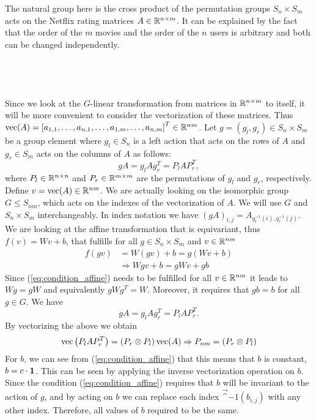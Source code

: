 \documentclass[english]{article}
\begin{document}
The natural group here is the cross product of the permutation groups
$S_n\times S_{m}$ acts on the Netflix rating matrices $A\in\RF^{n\times m}$.
It can be explained by the fact that the order of the $m$ movies
and the order of the $n$ users is arbitrary and both can be changed
independently.

\subsection{~}

\label{subsec:q21}


Since we look at the $G$-linear transformation from matrices in $\RF^{n\times m}$
to itself, it will be more convenient to consider the vectorization
of these matrices. Thus $\vec(A)=\left[a_{1,1},\ldots,a_{n,1},\ldots,a_{1,m},\ldots,a_{n,m}\right]^T\in\RF^{nm}$.
Let $g=\left(g_l,g_r\right)\in S_n\times S_{m}$ be a group
element where $g_l\in S_n$ is a left action that acts on the
rows of $A$ and $g_r\in S_{m}$ acts on the columns of $A$ as
follows: 
\begin{equation}
gA=g_lAg_r^T
=
P_lAP_r^T
,
\label{eq:groupAction}
\end{equation}
where $P_l\in\RF^{n\times n}$ and $P_r\in\RF^{m\times m}$ are
the permutations of $g_l$ and $g_r$, respectively. Define $v=\vec(A)\in\RF^{nm}$. 
We are actually looking on the isomorphic group $G \leq S_{nm}$, which acts on the indexes of the vectorization of $A$. We will use $G$ and $S_n \times S_m$ interchangeably.
In index notation we have $\left(gA\right)_{i,j}=A_{g_l^{-1}(i),g_r^{-1}(j)}$.
We are looking at the affine transformation that is equivariant, thus
$f(v)=Wv+b$, that fulfills for all $g\in S_n\times S_{m}$ and
$v\in\RF^{nm}$
\begin{align}
f(gv) 
&=
W\left(gv\right)+b=g\left(Wv+b\right)\nonumber \\
&
\Rightarrow Wgv+b=gWv+gb\label{eq:condition_affine}
\end{align}
Since (\ref{eq:condition_affine}) needs to be fulfilled for all $v\in\RF^{nm}$
it leads to $Wg=gW$ and equivalently $gWg^T=W$. Moreover, it requires
that $gb=b$ for all $g\in G$. 
We have 
\begin{equation}
gA=g_lAg_r^T=P_lAP_r^T.
\end{equation}
By vectorizing the above we obtain 
\begin{equation}
\vec\left(P_lAP_r^T\right)
=
\left(P_r\otimes P_l\right)\vec(A)
\Rightarrow
P_{nm} = \left(P_r\otimes P_l\right)
\end{equation}
For $b$, we can see from (\ref{eq:condition_affine}) that this means
that $b$ is constant, $b = c\cdot \oneb $. This can be seen by applying the inverse vectorization operation on $b$.
Since the condition (\ref{eq:condition_affine}) requires that $b$ will be invariant to the action of $g$, and by acting on $b$ we can replace each index $\vec^{-1}(b_{i,j})$ with any other index.
Therefore, all values of $b$ required to be the same.
\end{document}
